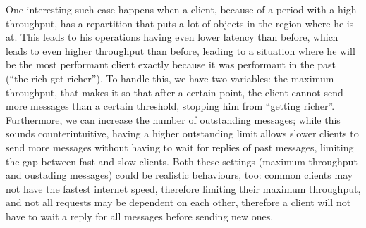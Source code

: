 One interesting such case happens when a client, because of a period with a high throughput, has a repartition that puts a lot of objects in the region where he is at. This leads to his operations having even lower latency than before, which leads to even higher throughput than before, leading to a situation where he will be the most performant client exactly because it was performant in the past (``the rich get richer''). To handle this, we have two variables: the maximum throughput, that makes it so that after a certain point, the client cannot send more messages than a certain threshold, stopping him from ``getting richer''. Furthermore, we can increase the number of outstanding messages; while this sounds counterintuitive, having a higher outstanding limit allows slower clients to send more messages without having to wait for replies of past messages, limiting the gap between fast and slow clients. Both these settings (maximum throughput and oustading messages) could be realistic behaviours, too: common clients may not have the fastest internet speed, therefore limiting their maximum throughput, and not all requests may be dependent on each other, therefore a client will not have to wait a reply for all messages before sending new ones.

